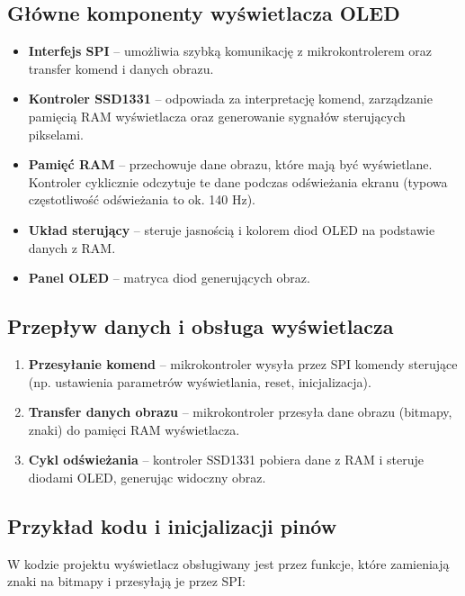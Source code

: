 \documentclass[a4paper,12pt]{report}
\begin{document}
\subsection*{Główne komponenty wyświetlacza OLED}

\begin{itemize}
    \item \textbf{Interfejs SPI} – umożliwia szybką komunikację z mikrokontrolerem oraz transfer komend i danych obrazu.
    \item \textbf{Kontroler SSD1331} – odpowiada za interpretację komend, zarządzanie pamięcią RAM wyświetlacza oraz generowanie sygnałów sterujących pikselami.
    \item \textbf{Pamięć RAM} – przechowuje dane obrazu, które mają być wyświetlane. Kontroler cyklicznie odczytuje te dane podczas odświeżania ekranu (typowa częstotliwość odświeżania to ok. 140 Hz).
    \item \textbf{Układ sterujący} – steruje jasnością i kolorem diod OLED na podstawie danych z RAM.
    \item \textbf{Panel OLED} – matryca diod generujących obraz.
\end{itemize}

\subsection*{Przepływ danych i obsługa wyświetlacza}

\begin{enumerate}
    \item \textbf{Przesyłanie komend} – mikrokontroler wysyła przez SPI komendy sterujące (np. ustawienia parametrów wyświetlania, reset, inicjalizacja).
    \item \textbf{Transfer danych obrazu} – mikrokontroler przesyła dane obrazu (bitmapy, znaki) do pamięci RAM wyświetlacza.
    \item \textbf{Cykl odświeżania} – kontroler SSD1331 pobiera dane z RAM i steruje diodami OLED, generując widoczny obraz.
\end{enumerate}

\subsection*{Przykład kodu i inicjalizacji pinów}

W kodzie projektu wyświetlacz obsługiwany jest przez funkcje, które zamieniają znaki na bitmapy i przesyłają je przez SPI:
\end{document}
